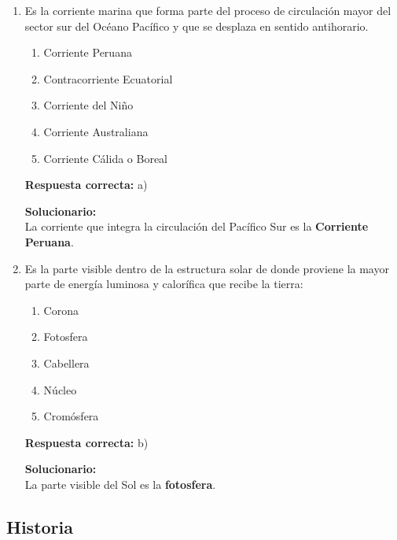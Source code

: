 \begin{enumerate}

	
	\item Es la corriente marina que forma parte del proceso de circulación mayor del sector sur del Océano Pacífico y que se desplaza en sentido antihorario.
	\begin{enumerate}[label=\alph*)]
		\item Corriente Peruana
		\item Contracorriente Ecuatorial
		\item Corriente del Niño
		\item Corriente Australiana
		\item Corriente Cálida o Boreal
	\end{enumerate}
	\textbf{Respuesta correcta:} a)
	
	\vspace{2mm}
	\textbf{Solucionario:}\\
	La corriente que integra la circulación del Pacífico Sur es la \textbf{Corriente Peruana}.
	
	\vspace{6mm}
	
	\item Es la parte visible dentro de la estructura solar de donde proviene la mayor parte de energía luminosa y calorífica que recibe la tierra:
	\begin{enumerate}[label=\alph*)]
		\item Corona
		\item Fotosfera
		\item Cabellera
		\item Núcleo
		\item Cromósfera
	\end{enumerate}
	\textbf{Respuesta correcta:} b)
	
	\vspace{2mm}
	\textbf{Solucionario:}\\
	La parte visible del Sol es la \textbf{fotosfera}.
	
	\vspace{6mm}
	
\end{enumerate}

\subsection*{Historia}


